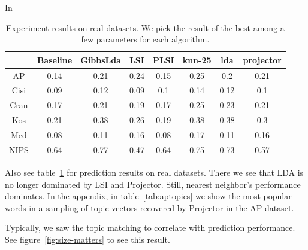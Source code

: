 In 
\begin{table}

\end{table}

\begin{table}[ht]
\begin{tabular}{|c|c|c|c|c|c|c|c|}
\hline 
 &Baseline &GibbsLda &LSI &PLSI &knn-25 &lda &projector \\
 \hline 
AP &0.14 &0.21 &0.24 &0.15 &0.25 &0.2 &0.21 \\
 \hline 
Cisi &0.09 &0.12 &0.09 &0.1 &0.14 &0.12 &0.1 \\
 \hline 
Cran &0.17 &0.21 &0.19 &0.17 &0.25 &0.23 &0.21 \\
 \hline 
Kos &0.21 &0.38 &0.26 &0.19 &0.38 &0.38 &0.3 \\
 \hline 
Med &0.08 &0.11 &0.16 &0.08 &0.17 &0.11 &0.16 \\
 \hline 
NIPS &0.64 &0.77 &0.47 &0.64 &0.75 &0.73 &0.57 \\
 \hline 

\end{tabular}
\caption{Experiment results on real datasets. We pick the result of the best among a few parameters for each algorithm. }
\label{tab:real}
\end{table}


Also see table~\ref{tab:real} for prediction results on real datasets.  There we see that
LDA is no longer dominated by LSI and Projector.  Still,  nearest neighbor's performance
dominates.  In the appendix, in table~\ref{tab:aptopics} we show the most popular
words in a sampling of topic vectors recovered by Projector in the AP dataset.

Typically, we saw the topic matching to correlate with prediction performance.
See figure~\ref{fig:size-matters} to see this result. 
